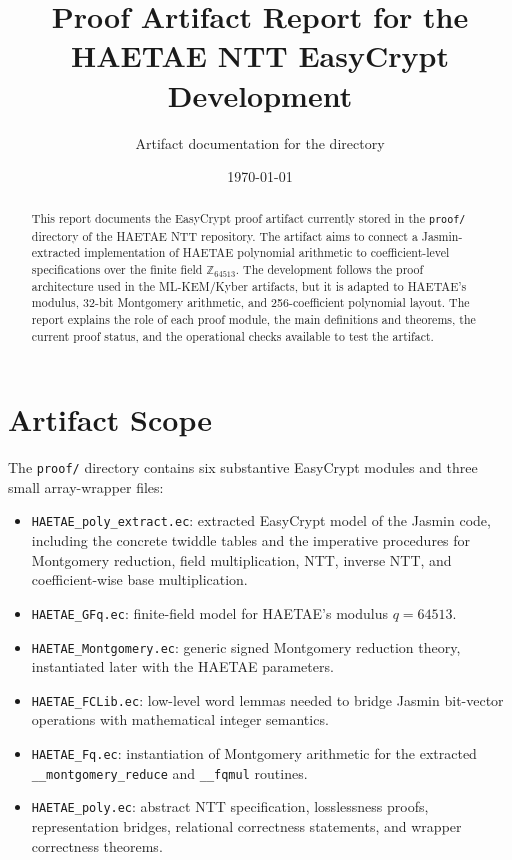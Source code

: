 \documentclass[11pt]{article}
\title{Proof Artifact Report for the HAETAE NTT EasyCrypt Development}
\author{Artifact documentation for the \file{proof/} directory}
\date{\today}
\newcommand{\file}[1]{\texttt{#1}}
\newcommand{\ec}[1]{\texttt{#1}}
\begin{document}
\maketitle

\begin{abstract}
This report documents the EasyCrypt proof artifact currently stored in the
\file{proof/} directory of the HAETAE NTT repository. The artifact aims to
connect a Jasmin-extracted implementation of HAETAE polynomial arithmetic to
coefficient-level specifications over the finite field $\mathbb{Z}_{64513}$.
The development follows the proof architecture used in the ML-KEM/Kyber
artifacts, but it is adapted to HAETAE's modulus, 32-bit Montgomery arithmetic,
and 256-coefficient polynomial layout. The report explains the role of each
proof module, the main definitions and theorems, the current proof status, and
the operational checks available to test the artifact.
\end{abstract}

\section{Artifact Scope}

The \file{proof/} directory contains six substantive EasyCrypt modules and three
small array-wrapper files:
\begin{itemize}[leftmargin=1.5em]
\item \file{HAETAE\_poly\_extract.ec}: extracted EasyCrypt model of the Jasmin
      code, including the concrete twiddle tables and the imperative procedures
      for Montgomery reduction, field multiplication, NTT, inverse NTT, and
      coefficient-wise base multiplication.
\item \file{HAETAE\_GFq.ec}: finite-field model for HAETAE's modulus
      $q = 64513$.
\item \file{HAETAE\_Montgomery.ec}: generic signed Montgomery reduction theory,
      instantiated later with the HAETAE parameters.
\item \file{HAETAE\_FCLib.ec}: low-level word lemmas needed to bridge Jasmin
      bit-vector operations with mathematical integer semantics.
\item \file{HAETAE\_Fq.ec}: instantiation of Montgomery arithmetic for the
      extracted \ec{\_\_montgomery\_reduce} and \ec{\_\_fqmul} routines.
\item \file{HAETAE\_poly.ec}: abstract NTT specification, losslessness proofs,
      representation bridges, relational correctness statements, and wrapper
      correctness theorems.
\end{itemize}
\end{document}
